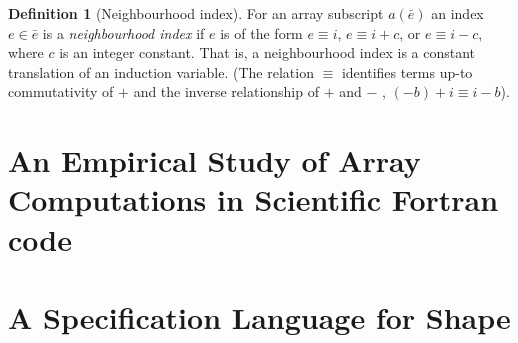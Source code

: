 \documentclass[acmlarge,review,anonymous]{acmart}\settopmatter{printfolios=true}
\theoremstyle{definition}
\newtheorem{defn}{Definition}
\theoremstyle{plain}
\theoremstyle{remark}
\begin{document}
\begin{defn}[Neighbourhood index]\label{def:neighbour-ix}
  For an array subscript $a(\bar{e})$ an index $e \in \bar{e}$ is a
  \emph{neighbourhood index} if $e$ is of the form $e \equiv i$, $e \equiv i +
  c$, or $e \equiv i - c$, where $c$ is an integer constant. That is, a
  neighbourhood index is a constant translation of an induction variable. (The
  relation $\equiv$ identifies terms up-to commutativity of $+$ and the inverse
  relationship of $+$ and $-$ \eg{}, $(-b) + i \equiv i - b$).
\end{defn}

\section{An Empirical Study of Array Computations in Scientific Fortran code}
\label{sec:study}


\section{A Specification Language for Shape}
\end{document}
